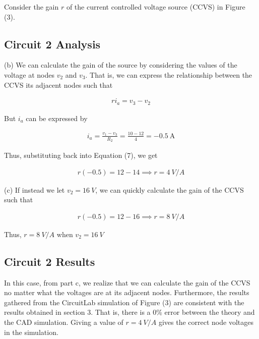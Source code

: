 \documentclass[12pt]{article}
\begin{document}
Consider the gain $r$ of the current controlled voltage source (CCVS) in Figure (3). 

\subsection{Circuit 2 Analysis}
(b) We can calculate the gain of the source by considering the values of the voltage at nodes $v_2$ and $v_3$. That is, we can express the relationship between the CCVS its adjacent nodes such that

\begin{equation}
    \begin{split}
        ri_a = v_3 - v_2
    \end{split}
\end{equation}

But $i_a$ can be expressed by

\begin{equation}
    \begin{split}
        i_a = \frac{v_1-v_3}{R_2} = \frac{10 - 12}{4} = \SI{-0.5}{\ampere}
    \end{split}
\end{equation}

Thus, substituting back into Equation (7), we get

\begin{equation}
    \begin{split}
        r(-0.5) = 12 - 14 \implies r = \SI{4}{V/A}
    \end{split}
\end{equation}

(c) If instead we let $v_2 = \SI{16}{V}$, we can quickly calculate the gain of the CCVS such that

\begin{equation}
    \begin{split}
        r(-0.5) = 12 - 16 \implies r = \SI{8}{V/A}
    \end{split}
\end{equation}

Thus, $r = \SI{8}{V/A}$ when $v_2 = \SI{16}{V}$

\subsection{Circuit 2 Results}

In this case, from part c, we realize that we can calculate the gain of the CCVS no matter what the voltages are at its adjacent nodes. Furthermore, the results gathered from the CircuitLab simulation of Figure (3) are consistent with the results obtained in section 3. That is, there is a 0\% error between the theory and the CAD simulation. Giving a value of $r=\SI{4}{V/A}$ gives the correct node voltages in the simulation.
\end{document}
